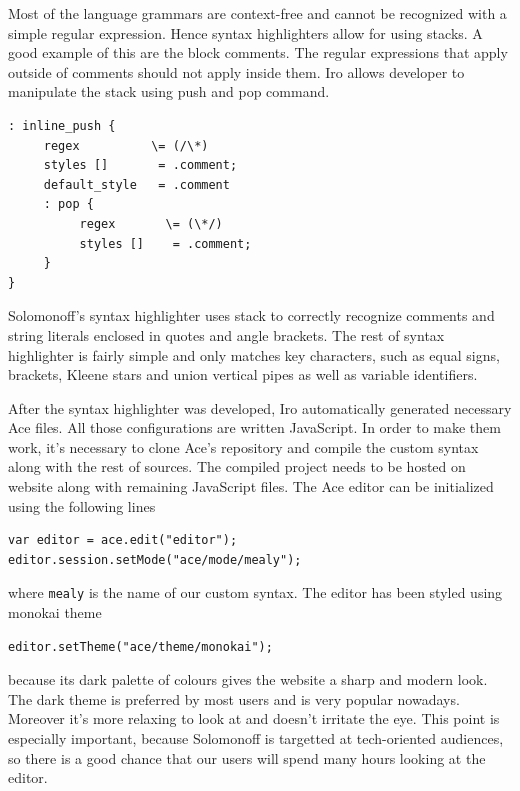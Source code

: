 Most of the language grammars are context-free and cannot be recognized with a simple regular expression. Hence syntax highlighters allow for using stacks. A good example of this are the block comments. The regular expressions that apply outside of comments should not apply inside them. Iro allows developer to manipulate the stack using push and pop command.
\begin{lstlisting}
: inline_push {
     regex          \= (/\*)
     styles []       = .comment;
     default_style   = .comment
     : pop {
          regex       \= (\*/)
          styles []    = .comment;
     }
}
\end{lstlisting}
Solomonoff's syntax highlighter uses stack to correctly recognize comments and string literals enclosed in quotes and angle brackets. The rest of syntax highlighter is fairly simple and only matches key characters, such as equal signs, brackets, Kleene stars and union vertical pipes as well as variable identifiers.

After the syntax highlighter was developed, Iro automatically generated necessary Ace files. All those configurations are written JavaScript. In order to make them work, it's necessary to clone Ace's repository and compile the custom syntax along with the rest of sources. The compiled project needs to be hosted on website along with remaining JavaScript files. The Ace editor can be initialized using the following lines
\begin{lstlisting}
var editor = ace.edit("editor");
editor.session.setMode("ace/mode/mealy");
\end{lstlisting}
where \texttt{mealy} is the name of our custom syntax.
The editor has been styled using monokai theme
\begin{lstlisting}
editor.setTheme("ace/theme/monokai");
\end{lstlisting}
because its dark palette of colours gives the website a sharp and modern look. The dark theme is preferred by most users and is very popular nowadays. Moreover it's more relaxing to look at and doesn't irritate the eye. This point is especially important, because Solomonoff is targetted at tech-oriented audiences, so there is a good chance that our users will spend many hours looking at the editor. 

